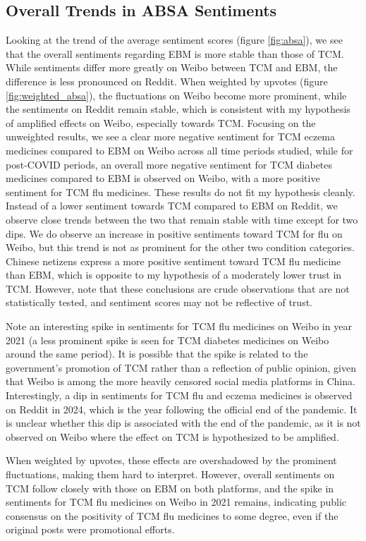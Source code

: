 \documentclass[11pt]{article}
\begin{document}
\subsection{Overall Trends in ABSA Sentiments}

Looking at the trend of the average sentiment scores (figure \ref{fig:absa}), we see that the overall sentiments regarding EBM is more stable than those of TCM. While sentiments differ more greatly on Weibo between TCM and EBM, the difference is less pronounced on Reddit. When weighted by upvotes (figure \ref{fig:weighted_absa}), the fluctuations on Weibo become more prominent, while the sentiments on Reddit remain stable, which is consistent with my hypothesis of amplified effects on Weibo, especially towards TCM. Focusing on the unweighted results, we see a clear more negative sentiment for TCM eczema medicines compared to EBM on Weibo across all time periods studied, while for post-COVID periods, an overall more negative sentiment for TCM diabetes medicines compared to EBM is observed on Weibo, with a more positive sentiment for TCM flu medicines. These results do not fit my hypothesis cleanly. Instead of a lower sentiment towards TCM compared to EBM on Reddit, we observe close trends between the two that remain stable with time except for two dips. We do observe an increase in positive sentiments toward TCM for flu on Weibo, but this trend is not as prominent for the other two condition categories. Chinese netizens express a more positive sentiment toward TCM flu medicine than EBM, which is opposite to my hypothesis of a moderately lower trust in TCM. However, note that these conclusions are crude observations that are not statistically tested, and sentiment scores may not be reflective of trust.

Note an interesting spike in sentiments for TCM flu medicines on Weibo in year 2021 (a less prominent spike is seen for TCM diabetes medicines on Weibo around the same period). It is possible that the spike is related to the government's promotion of TCM rather than a reflection of public opinion, given that Weibo is among the more heavily censored social media platforms in China. Interestingly, a dip in sentiments for TCM flu and eczema medicines is observed on Reddit in 2024, which is the year following the official end of the pandemic. It is unclear whether this dip is associated with the end of the pandemic, as it is not observed on Weibo where the effect on TCM is hypothesized to be amplified.

When weighted by upvotes, these effects are overshadowed by the prominent fluctuations, making them hard to interpret. However, overall sentiments on TCM follow closely with those on EBM on both platforms, and the spike in sentiments for TCM flu medicines on Weibo in 2021 remains, indicating public consensus on the positivity of TCM flu medicines to some degree, even if the original posts were promotional efforts.
\end{document}
